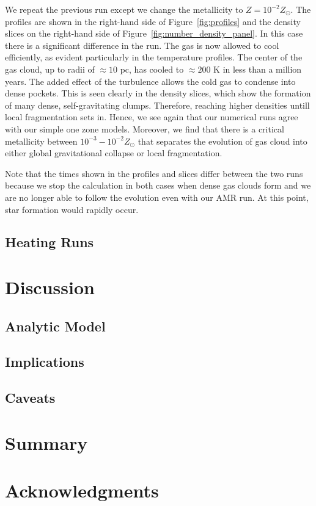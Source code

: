 \documentclass[useAMS,usenatbib]{mn2e}
\begin{document}
We repeat the previous run except we change the metallicity to $Z=10^{-2}Z_\odot$.  The profiles are shown
in the right-hand side of Figure~\ref{fig:profiles} and the density slices on the right-hand side of Figure~\ref{fig:number_density_panel}.  In this case there is a significant difference in the run.
The gas is now allowed to cool efficiently, as evident particularly in the temperature profiles.   The center
of the gas cloud, up to radii of $\approx 10$ pc, has cooled to $\approx 200$ K in less than a million years. The added effect of the turbulence
allows the cold gas to condense into dense pockets.  This is seen clearly in the density slices, which show the formation of many dense, self-gravitating clumps.  
Therefore, reaching higher densities untill local fragmentation sets in.
Hence, we see again that our numerical runs agree with our simple one zone models. Moreover, we find that there is a critical metallicity
between $10^{-3}-10^{-2}Z_\odot$ that separates the evolution of gas cloud into either global gravitational collapse or local fragmentation. 

Note that the times shown in the profiles and slices differ between the two runs because we stop the calculation in both cases when dense gas clouds form and we are no longer able to follow the evolution even with our AMR run.  At this point, star formation would rapidly occur.



 
\subsection{Heating Runs}

% 
\section{Discussion}
\label{sec:discussion}
\subsection{Analytic Model}
\subsection{Implications}
\subsection{Caveats}

% 
\section{Summary}

% 
\section*{Acknowledgments}

%
\end{document}

